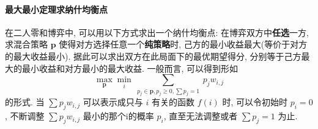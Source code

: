 \paragraph{最大最小定理求纳什均衡点} 在二人零和博弈中,
可以用以下方式求出一个纳什均衡点:
在博弈双方中\textbf{任选}一方,
求混合策略 $\mathbf{p}$ 使得对方选择任意一个\textbf{纯策略}时,
己方的最小收益最大(等价于对方的最大收益最小).
据此可以求出双方在此局面下的最优期望得分,
分别等于己方最大的最小收益和对方最小的最大收益. 一般而言, 可以得到形如
$$\max_{\mathbf{p}} \min_i\ \sum_{p_j\in \mathbf{p}, p_j\ge 0, \sum p_j=1}\ p_jw_{i,j} $$
的形式. 当 $\sum p_jw_{i,j}$ 可以表示成只与 $i$ 有关的函数 $f(i)$ 时, 可以令初始时 $p_i=0$, 不断调整 $\sum p_jw_{i,j}$ 最小的那个i的概率 $p_i$, 直至无法调整或者 $\sum p_j=1$ 为止.
